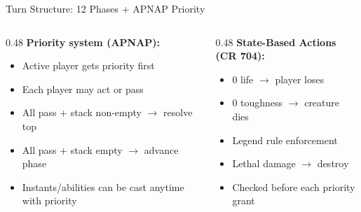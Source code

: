 \documentclass[aspectratio=169, 10pt]{beamer}
\begin{document}
\begin{frame}{Turn Structure: 12 Phases + APNAP Priority}
\begin{center}
  \end{center}
  \vspace{0.3cm}
  \begin{columns}[T]
    \begin{column}{0.48\textwidth}
      \footnotesize
      \textbf{Priority system (APNAP):}
      \begin{itemize}\scriptsize
        \item Active player gets priority first
        \item Each player may act or pass
        \item All pass + stack non-empty $\to$ resolve top
        \item All pass + stack empty $\to$ advance phase
        \item Instants/abilities can be cast anytime with priority
      \end{itemize}
    \end{column}
    \begin{column}{0.48\textwidth}
      \footnotesize
      \textbf{State-Based Actions (CR 704):}
      \begin{itemize}\scriptsize
        \item 0 life $\to$ player loses
        \item 0 toughness $\to$ creature dies
        \item Legend rule enforcement
        \item Lethal damage $\to$ destroy
        \item Checked before each priority grant
      \end{itemize}
    \end{column}
  \end{columns}
\end{frame}
\end{document}
